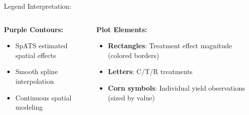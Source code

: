 \documentclass[aspectratio=43]{beamer}
\begin{document}
\begin{frame}
\begin{block}{\small Legend Interpretation:}
\begin{columns}
            \begin{column}{0.33\textwidth}
                \textbf{Purple Contours:}
                \begin{itemize}
                    \scriptsize
                    \item SpATS estimated spatial effects
                    \item Smooth spline interpolation
                    \item Continuous spatial modeling
                \end{itemize}
            \end{column}
            
            \begin{column}{0.33\textwidth}
                \textbf{Plot Elements:}
                \begin{itemize}
                    \scriptsize
                    \item \textbf{Rectangles}: Treatment effect magnitude (colored borders)
                    \item \textbf{Letters}: C/T/R treatments
                    \item \textbf{Corn symbols}: Individual yield observations (sized by value)
                \end{itemize}
            \end{column}
        \end{columns}
    \end{block}
\end{frame}
\end{document}
